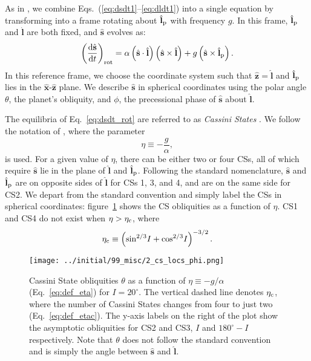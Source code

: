 \documentclass[
        fleqn,
        usenatbib,
    ]{mnras}
\newcommand*{\rd}[2]{\frac{\mathrm{d}#1}{\mathrm{d}#2}}
\newcommand*{\p}[1]{\left(#1\right)}
\newcommand*{\uv}[1]{\hat{\mathbf{#1}}}
\begin{document}
As in \citet{su2020}, we combine Eqs.~(\ref{eq:dsdt1}--\ref{eq:dldt1}) into a
single equation by transforming into a frame rotating about $\uv{l}_{\rm p}$
with frequency $g$. In this frame, $\uv{l}_{\rm p}$ and $\uv{l}$ are both fixed,
and $\uv{s}$ evolves as:
\begin{equation}
    \p{\rd{\uv{s}}{t}}_{\rm rot}
        = \alpha\p{\uv{s} \cdot \uv{l}}\p{\uv{s} \times \uv{l}}
            + g\p{\uv{s} \times \uv{l}_{\rm p}}. \label{eq:dsdt_rot}
\end{equation}
In this reference frame, we choose the coordinate system such that $\uv{z} =
\uv{l}$ and $\uv{l}_{\rm p}$ lies in the $\uv{x}$-$\uv{z}$ plane. We describe
$\uv{s}$ in spherical coordinates using the polar angle $\theta$, the planet's
obliquity, and $\phi$, the precessional phase of $\uv{s}$ about $\uv{l}$.

The equilibria of Eq.~\eqref{eq:dsdt_rot} are referred to as \emph{Cassini
States} \citep[CSs;][]{colombo1966, peale1969}. We follow the notation of
\citet{su2020}, where the parameter
\begin{equation}
    \eta \equiv -\frac{g}{\alpha},\label{eq:def_eta}
\end{equation}
is used. For a given value of $\eta$, there can be either two or four CSs, all
of which require $\uv{s}$ lie in the plane of $\uv{l}$ and $\uv{l}_{\rm p}$.
Following the standard nomenclature, $\uv{s}$ and
$\uv{l}_{\rm p}$ are on opposite sides of $\uv{l}$ for CSs 1, 3, and 4, and are
on the same side for CS2. We depart from the standard convention
and simply label the CSs in spherical coordinates: figure~\ref{fig:cs_locs}
shows the CS obliquities as a function of $\eta$. CS1 and CS4 do not exist when
$\eta > \eta_{\rm c}$, where
\begin{equation}
    \eta_{\rm c} \equiv \p{\sin^{2/3}\!I + \cos^{2/3}\!I}^{-3/2}.
        \label{eq:def_etac}
\end{equation}
\begin{figure}
    \centering
    \texttt{[image: ../initial/99\_misc/2\_cs\_locs\_phi.png]}
    \caption{Cassini State obliquities $\theta$ as a function of $\eta \equiv
    -g/\alpha$ (Eq.~\ref{eq:def_eta}) for $I = 20^\circ$. The vertical dashed
    line denotes $\eta_{\rm c}$, where the number of Cassini States changes from
    four to just two (Eq.~\ref{eq:def_etac}). The y-axis labels on the right of
    the plot show the asymptotic obliquities for CS2 and CS3, $I$ and $180^\circ
    - I$ respectively. Note that $\theta$ does not follow the standard
    convention \citep[e.g.][]{colombo1966} and is simply the angle between
    $\uv{s}$ and $\uv{l}$.}\label{fig:cs_locs}
\end{figure}
\end{document}

